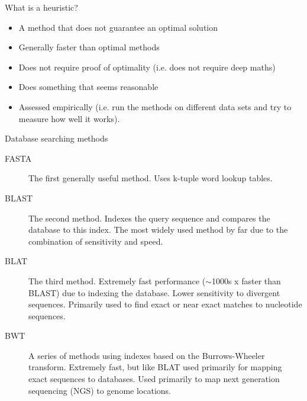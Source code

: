 \documentclass[pdf]{beamer}
\begin{document}
\begin{frame}{What is a heuristic?}
  \begin{itemize}
  \item A method that does not guarantee an optimal solution
  \item Generally faster than optimal methods
  \item Does not require proof of optimality (i.e. does not require deep
    maths)
  \item Does something that seems reasonable
  \item Assessed empirically (i.e. run the methods on different data sets and
    try to measure how well it works).
  \end{itemize}
\end{frame}

\begin{frame}{Database searching methods}
  \begin{description}
    \item[FASTA] The first generally useful method. Uses k-tuple word lookup
      tables.
    \item[BLAST] The second method. Indexes the query sequence and compares
      the database to this index. The most widely used method by far due to
      the combination of sensitivity and speed.
    \item[BLAT] The third method. Extremely fast performance ($\sim$1000s x
      faster than BLAST) due to indexing the database. Lower sensitivity to divergent
      sequences. Primarily used to find exact or near exact matches to
      nucleotide sequences.
    \item[BWT] A series of methods using indexes based on the Burrows-Wheeler
      transform. Extremely fast, but like BLAT used primarily for mapping
      exact sequences to databases. Used primarily to map next generation
      sequencing (NGS) to genome locations.
  \end{description}
\end{frame}
\end{document}
